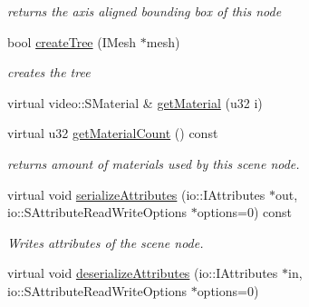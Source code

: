 \begin{DoxyCompactItemize}
\begin{DoxyCompactList}\small\item\em returns the axis aligned bounding box of this node \end{DoxyCompactList}\item 
\hypertarget{classirr_1_1scene_1_1_c_octree_scene_node_a7b13ad491fca4a8baf4775fe83c99eee}{bool \hyperlink{classirr_1_1scene_1_1_c_octree_scene_node_a7b13ad491fca4a8baf4775fe83c99eee}{create\-Tree} (I\-Mesh $\ast$mesh)}\label{classirr_1_1scene_1_1_c_octree_scene_node_a7b13ad491fca4a8baf4775fe83c99eee}

\begin{DoxyCompactList}\small\item\em creates the tree \end{DoxyCompactList}\item 
virtual video\-::\-S\-Material \& \hyperlink{classirr_1_1scene_1_1_c_octree_scene_node_ad9de3cdec5587b9446d135ff48595982}{get\-Material} (u32 i)
\item 
\hypertarget{classirr_1_1scene_1_1_c_octree_scene_node_adbc3a22d6eb63bdece57ae0445b9fde1}{virtual u32 \hyperlink{classirr_1_1scene_1_1_c_octree_scene_node_adbc3a22d6eb63bdece57ae0445b9fde1}{get\-Material\-Count} () const }\label{classirr_1_1scene_1_1_c_octree_scene_node_adbc3a22d6eb63bdece57ae0445b9fde1}

\begin{DoxyCompactList}\small\item\em returns amount of materials used by this scene node. \end{DoxyCompactList}\item 
\hypertarget{classirr_1_1scene_1_1_c_octree_scene_node_afb81008e13075167888606c334cf5034}{virtual void \hyperlink{classirr_1_1scene_1_1_c_octree_scene_node_afb81008e13075167888606c334cf5034}{serialize\-Attributes} (io\-::\-I\-Attributes $\ast$out, io\-::\-S\-Attribute\-Read\-Write\-Options $\ast$options=0) const }\label{classirr_1_1scene_1_1_c_octree_scene_node_afb81008e13075167888606c334cf5034}

\begin{DoxyCompactList}\small\item\em Writes attributes of the scene node. \end{DoxyCompactList}\item 
\hypertarget{classirr_1_1scene_1_1_c_octree_scene_node_ada355a7b6343dc1e0483180d4baafb19}{virtual void \hyperlink{classirr_1_1scene_1_1_c_octree_scene_node_ada355a7b6343dc1e0483180d4baafb19}{deserialize\-Attributes} (io\-::\-I\-Attributes $\ast$in, io\-::\-S\-Attribute\-Read\-Write\-Options $\ast$options=0)}\label{classirr_1_1scene_1_1_c_octree_scene_node_ada355a7b6343dc1e0483180d4baafb19}


\end{DoxyCompactItemize}
